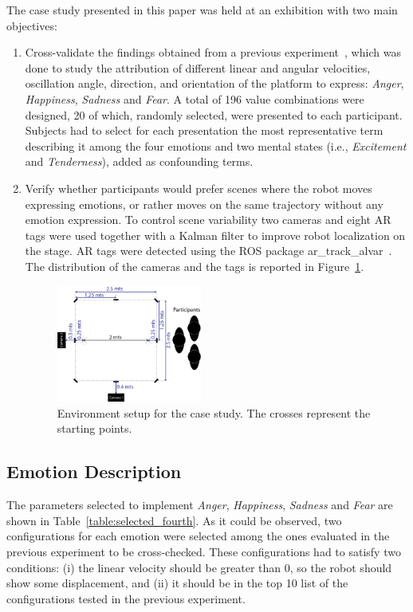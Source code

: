  The case study presented in this paper was held at an exhibition with two main objectives:
\begin{enumerate}
	\item Cross-validate the findings obtained from a previous experiment~\cite{Angel2017-2}, which was done to study the attribution of different linear and angular velocities, oscillation angle, direction, and orientation of the platform to express: \textit{Anger}, \textit{Happiness}, \textit{Sadness} and \textit{Fear}. A total of 196 value combinations were designed, 20 of which, randomly selected, were presented to each participant. Subjects had to select for each presentation the most representative term describing it among the four emotions and two mental states (i.e., \textit{Excitement} and \textit{Tenderness}), added as confounding terms.
	\item Verify whether participants would prefer scenes where the robot moves expressing emotions, or rather moves on the same trajectory without any emotion expression. To control scene variability two cameras and eight AR tags were used together with a Kalman filter to improve robot localization on the stage. AR tags were detected using the ROS package ar\_track\_alvar~\cite{artag2015}. The distribution of the cameras and the tags is reported in Figure~\ref{fig:setup_fourth}. 

\begin{figure}
	\centering
	\includegraphics[width=0.45\textwidth]{./Images/FourthCase.png} 
	\caption{Environment setup for the case study. The crosses represent the starting points.}
	\label{fig:setup_fourth}
\end{figure}
 
\end{enumerate}

\subsection{Emotion Description}

The parameters selected to implement \textit{Anger}, \textit{Happiness}, \textit{Sadness} and \textit{Fear} are shown in Table~\ref{table:selected_fourth}. As it could be observed, two configurations for each emotion were selected among the ones evaluated in the previous experiment to be cross-checked. These configurations had to satisfy two conditions: (i) the linear velocity should be greater than $0$, so the robot should show some displacement, and (ii) it should be in the top 10 list of the configurations tested in the previous experiment.

